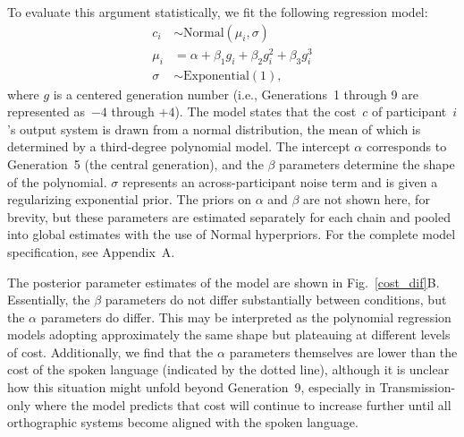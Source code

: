 \documentclass[doc,biblatex]{apa7}
\begin{document}
To evaluate this argument statistically, we fit the following regression model:
	\begin{equation}
	\begin{aligned}
	   c_i & \sim \mathrm{Normal}(\mu_i, \sigma) \\
	 \mu_i & =    \alpha + \beta_1 g_i + \beta_2 g_i^2 + \beta_3 g_i^3 \\
	\sigma & \sim \mathrm{Exponential}(1),
	\end{aligned}
	\end{equation}
where $g$ is a centered generation number (i.e., Generations~1 through 9 are represented as~$-4$ through $+4$). The model states that the cost~$c$ of participant~$i$'s output system is drawn from a normal distribution, the mean of which is determined by a third-degree polynomial model. The intercept $\alpha$ corresponds to Generation~5 (the central generation), and the $\beta$ parameters determine the shape of the polynomial. $\sigma$ represents an across-participant noise term and is given a regularizing exponential prior. The priors on $\alpha$ and $\beta$ are not shown here, for brevity, but these parameters are estimated separately for each chain and pooled into global estimates with the use of Normal hyperpriors. For the complete model specification, see Appendix~A.

The posterior parameter estimates of the model are shown in Fig.~\ref{cost_dif}B. Essentially, the $\beta$ parameters do not differ substantially between conditions, but the $\alpha$ parameters do differ. This may be interpreted as the polynomial regression models adopting approximately the same shape but plateauing at different levels of cost. Additionally, we find that the $\alpha$ parameters themselves are lower than the cost of the spoken language (indicated by the dotted line), although it is unclear how this situation might unfold beyond Generation~9, especially in Transmission-only where the model predicts that cost will continue to increase further until all orthographic systems become aligned with the spoken language.
\end{document}
